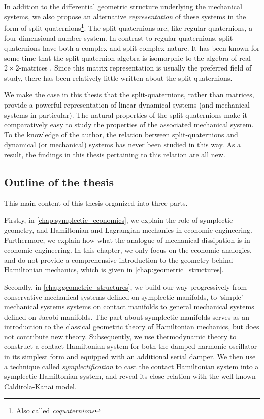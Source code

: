 In addition to the differential geometric structure underlying the mechanical systems, we also propose an alternative \emph{representation} of these systems in the form of split-quaternions\footnote{Also called \emph{coquaternions}}. The split-quaternions are, like regular quaternions, a four-dimensional number system. In contrast to regular quaternions, split-quaternions have both a complex and split-complex nature. It has been known for some time that the split-quaternion algebra is isomorphic to the algebra of real $2\times2$-matrices \cite{Jafari2014}. Since this matrix representation is usually the preferred field of study, there has been relatively little written about the split-quaternions. 

We make the case in this thesis that the split-quaternions, rather than matrices, provide a powerful representation of linear dynamical systems (and mechanical systems in particular). The natural properties of the split-quaternions make it comparatively easy to study the properties of the associated mechanical system. To the knowledge of the author, the relation between split-quaternions and dynamical (or mechanical) systems has never been studied in this way. As a result, the findings in this thesis pertaining to this relation are all new.

\subsection*{Outline of the thesis}
This main content of this thesis organized into three parts. 

Firstly, in \cref{chap:symplectic_economics}, we explain the role of symplectic geometry, and Hamiltonian and Lagrangian mechanics in economic engineering. Furthermore, we explain how what the analogue of mechanical dissipation is in economic engineering. In this chapter, we only focus on the economic analogies, and do not provide a comprehensive introduction to the geometry behind Hamiltonian mechanics, which is given in \cref{chap:geometric_structures}. %

Secondly, in \cref{chap:geometric_structures}, we build our way progressively from conservative mechanical systems defined on symplectic manifolds, to `simple' mechanical systems systems on contact manifolds to general mechanical systems defined on Jacobi manifolds. The part about symplectic manifolds serves as an introduction to the classical geometric theory of Hamiltonian mechanics, but does not contribute new theory. Subsequently, we use thermodynamic theory to construct a contact Hamiltonian system for both the damped harmonic oscillator in its simplest form and equipped with an additional serial damper. We then use a technique called \emph{symplectification} to cast the contact Hamiltonian system into a symplectic Hamiltonian system, and reveal its close relation with the well-known Caldirola-Kanai model.

